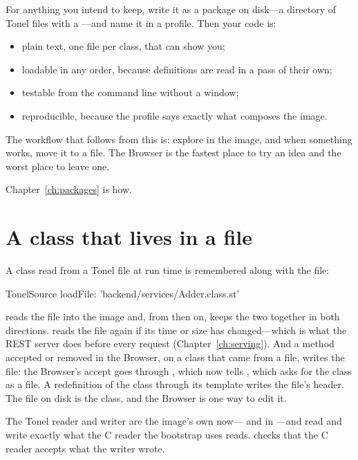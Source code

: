 For anything you intend to keep, write it as a package on disk---a directory
of Tonel files with a ---and name it in a profile. Then your
code is:

\begin{itemize}
\item plain text, one file per class, that  can show you;
\item loadable in any order, because definitions are read in a pass of their
  own;
\item testable from the command line without a window;
\item reproducible, because the profile says exactly what composes the image.
\end{itemize}

The workflow that follows from this is: explore in the image, and when
something works, move it to a file. The Browser is the fastest place to try an
idea and the worst place to leave one.

Chapter~\ref{ch:packages} is how.

\section{A class that lives in a file}

A class read from a Tonel file at run time is remembered along with the file:

\begin{st}
TonelSource loadFile: 'backend/services/Adder.class.st'
\end{st}

reads the file into the image and, from then on, keeps the two together in
both directions.  reads the file again
if its time or size has changed---which is what the REST server does before
every request (Chapter~\ref{ch:serving}). And a method accepted or removed in
the Browser, on a class that came from a file, writes the file: the Browser's
accept goes through , which now tells
, which asks  for the class as a file. A
redefinition of the class through its template writes the file's header. The
file on disk is the class, and the Browser is one way to edit it.

\begin{stnote}
The Tonel reader and writer are the image's own now--- and
 in ---and read and write exactly what the C
reader the bootstrap uses reads.  checks that the
C reader accepts what the writer wrote.
\end{stnote}

